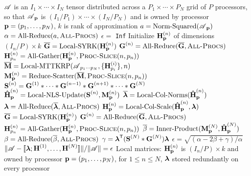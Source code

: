 
\appendix
\label{sec:appendix}

\begin{algorithm}
\caption{$(\CPl,\epsilon) = \text{Par-NNCP}(\TA,k)$}
\label{alg:Par-NNCP-long}
\begin{algorithmic}[1]
\Require $\TA$ is an $I_1\times \cdots \times I_N$ tensor distributed across a $P_1\times \cdots \times P_N$ grid of $P$ processors, so that $\TA_{\V{p}}$ is $(I_1/P_1)\times \cdots \times (I_N/P_N)$ and is owned by processor $\V{p}=(p_1,\dots,p_N)$, $k$ is rank of approximation
\State {}
\State $a = \text{Norm-Squared}(\TA_{\V{p}})$
\State $\alpha = \text{All-Reduce}(a,\textsc{All-Procs})$
\State $\epsilon = $ \texttt{Inf}
	\State Initialize $\Mn{H}{n}_{\V{p}}$ of dimensions $(I_n/P)\times k$ 
	\State $\M[\overline]{G} = \text{Local-SYRK}(\Mn{H}{n}_{\V{p}})$
	\State $\Mn{G}{n} = \text{All-Reduce}(\M[\overline]{G},\textsc{All-Procs})$
	\State $\Mn{H}{n}_{p_n} = \text{All-Gather}(\Mn{H}{n}_{\V{p}},\textsc{Proc-Slice}(n,\VE{p}{n}))$
\EndFor
\State {}
	\State {}
	\State {}
	\State $\M[\overline]{M} = \text{Local-MTTKRP}(\TA_{p_1\cdots p_N},\{\Mn{H}{i}_{p_i}\},n)$
	\State $\Mn{M}{n}_{\V{p}} = \text{Reduce-Scatter}(\M[\overline]{M},\textsc{Proc-Slice}(n,\VE{p}{n}))$ 
	\State $\Mn{S}{n} = \Mn{G}{1} \Hada \cdots \Hada \Mn{G}{n-1} \Hada \Mn{G}{n+1} \Hada \cdots \Hada \Mn{G}{N}$
	\State $\Mn[\hat]{H}{n}_{\V{p}} = \text{Local-NLS-Update}(\Mn{S}{n},\Mn{M}{n}_{\V{p}})$
	\State {}
	\State $\V[\overline]{\lambda} = \text{Local-Col-Norms}(\Mn[\hat]{H}{n}_{\V{p}})$
	\State $\V{\lambda} = \text{All-Reduce}(\V[\overline]{\lambda},\textsc{All-Procs})$
	\State $\Mn{H}{n}_{\V{p}} = \text{Local-Col-Scale}(\Mn[\hat]{H}{n}_{\V{p}},\V{\lambda})$
	\State {}
	\State $\M[\overline]{G} = \text{Local-SYRK}(\Mn{H}{n}_{\V{p}})$
	\State $\Mn{G}{n} = \text{All-Reduce}(\M[\overline]{G},\textsc{All-Procs})$
	\State $\Mn{H}{n}_{p_n} = \text{All-Gather}(\Mn{H}{n}_{\V{p}},\textsc{Proc-Slice}(n,\VE{p}{n}))$
	\EndFor
	\State {}
	\State $\overline{\beta} = \text{Inner-Product}(\Mn{M}{N}_{\V{p}},\Mn[\hat]{H}{N}_{\V{p}})$
	\State $\beta = \text{All-Reduce}(\overline{\beta},\textsc{All-Procs})$
	\State $\gamma = \V{\lambda}^\Tra (\Mn{S}{N} \Hada \Mn{G}{N}) \V{\lambda}$
	\State $\epsilon = \sqrt{(\alpha-2\beta+\gamma)/\alpha}$ 
\EndWhile
\Ensure $\|\TA - \dsquare{\V{\lambda}; \Mn{H}{1},\dots,\Mn{H}{N}}\| /\|\TA\| = \epsilon$
\Ensure Local matrices: $\Mn{H}{n}_{\V{p}}$ is $(I_n/P)\times k$ and owned by processor $\V{p}=(p_1,\dots,p_N)$, for $1\leq n \leq N$, $\V{\lambda}$ stored redundantly on every processor
\end{algorithmic}
\end{algorithm}

